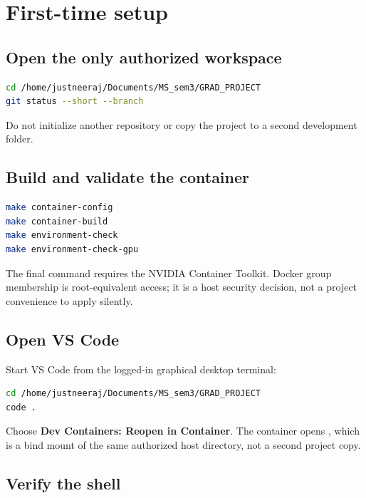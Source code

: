 \documentclass[11pt,oneside,openany]{book}
\newcommand{\file}[1]{\path{#1}}
\begin{document}
\chapter{First-time setup}

\section{Open the only authorized workspace}

\begin{lstlisting}[language=bash]
cd /home/justneeraj/Documents/MS_sem3/GRAD_PROJECT
git status --short --branch
\end{lstlisting}

Do not initialize another repository or copy the project to a second development folder.

\section{Build and validate the container}

\begin{lstlisting}[language=bash]
make container-config
make container-build
make environment-check
make environment-check-gpu
\end{lstlisting}

The final command requires the NVIDIA Container Toolkit. Docker group membership is root-equivalent access; it is a host security decision, not a project convenience to apply silently.

\section{Open VS Code}

Start VS Code from the logged-in graphical desktop terminal:
\begin{lstlisting}[language=bash]
cd /home/justneeraj/Documents/MS_sem3/GRAD_PROJECT
code .
\end{lstlisting}
Choose \textbf{Dev Containers: Reopen in Container}. The container opens \file{/workspace}, which is a bind mount of the same authorized host directory, not a second project copy.

\section{Verify the shell}
\end{document}
